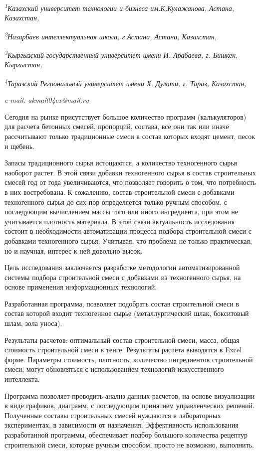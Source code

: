 \begin{affiliation}
\emph{\textsuperscript{1}Казахский университет технологии и бизнеса им.К.Кулажанова, Астана, Казахстан,}

\emph{\textsuperscript{2}Назарбаев интеллектуальная школа, г.Астана, Астана, Казахстан,}

\emph{\textsuperscript{3}Кыргызский государственный университет имени И. Арабаева, г. Бишкек, Кыргыстан,}

\emph{\textsuperscript{4}Таразский Региональный университет имени Х. Дулати, г. Тараз, Казахстан,}

\emph{e-mail: akmail04cx@mail.ru}
\end{affiliation}

Сегодня на рынке присутствует большое количество программ
(калькуляторов) для расчета бетонных смесей, пропорций, состава, все они
так или иначе рассчитывают только традиционные смеси в состав которых
входят цемент, песок и щебень.

Запасы традиционного сырья истощаются, а количество техногенного сырья
наоборот растет. В этой связи добавки техногенного сырья в состав
строительных смесей год от года увеличиваются, что позволяет говорить о
том, что потребность в них востребована. К сожалению, состав
строительной смеси с добавками техногенного сырья до сих пор
определяется только ручным способом, с последующим вычислением массы
того или иного ингредиента, при этом не учитывается плотность материала.
В этой связи актуальность исследования состоит в необходимости
автоматизации процесса подбора строительной смеси с добавками
техногенного сырья. Учитывая, что проблема не только практическая, но и
научная, интерес к ней довольно высок.

Цель исследования заключается разработке методологии автоматизированной
системы подбора строительной смеси с добавками из техногенного сырья, на
основе применения информационных технологий.

Разработанная программа, позволяет подобрать состав строительной смеси в
состав которой входит техногенное сырье (металлургический шлак,
бокситовый шлам, зола уноса).

Результаты расчетов: оптимальный состав строительной смеси, масса, общая
стоимость строительной смеси в тенге. Результаты расчета выводятся в
Excel форме. Параметры стоимость, плотность, количество ингредиентов
строительной смеси, могут обновляться с использованием технологий
искусственного интеллекта.

Программа позволяет проводить анализ данных расчетов, на основе
визуализации в виде графиков, диаграмм, с последующим принятием
управленческих решений. Полученные составы строительных смесей нуждаются
в лабораторных экспериментах, в зависимости от назначения. Эффективность
использования разработанной программы, обеспечивает подбор большого
количества рецептур строительной смеси, которые ручным способом, просто
не возможно, выполнить.

